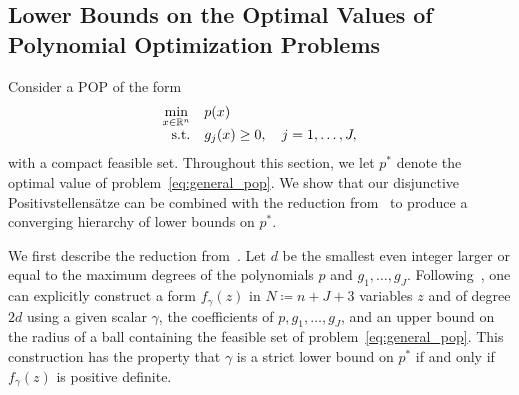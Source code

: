 \documentclass[12pt]{article}
\newcommand{\reals}{\mathbb{R}}
\newcommand{\defeq}{\coloneq}
\newcommand{\st}{\text{s.t.}}
\theoremstyle{remark}
\begin{document}
\subsection{Lower Bounds on the Optimal Values of Polynomial Optimization Problems}\label{sec:hierarchy}
Consider a POP of the form
\begin{equation}\label{eq:general_pop}
	\begin{array}{rl}
    \min\limits_{x\in{\scriptsize\reals^n}} & p(x)\\
		\st & g_j(x)\ge 0, \quad j=1,\ldots,J,
	\end{array}    
\end{equation}
with a compact feasible set. Throughout this section, we let $p^*$ denote the optimal value of problem~\eqref{eq:general_pop}.  
We show that our disjunctive Positivstellens\"atze can be combined with the reduction from~\cite[Theorem 2.1]{aaa2019} to produce a converging hierarchy of lower bounds on $p^*$. 

We first describe the reduction from~\cite{aaa2019}. 
Let $d$ be the smallest even integer larger or equal to the maximum degrees of the polynomials $p$ and $g_1,\ldots,g_J$. Following~\cite[Theorem 2.1]{aaa2019}, one can explicitly construct a form $f_{\gamma}(z)$ in $N\defeq n+J+3$ variables $z$ and of degree $2d$ using a given scalar $\gamma$, the coefficients of $p, g_1,\ldots,g_J$, and an upper bound on the radius of a ball containing the feasible set of problem~\eqref{eq:general_pop}. This construction has the property that $\gamma$ is a strict lower bound on $p^*$ if and only if $f_{\gamma}(z)$ is positive definite. 
\end{document}
